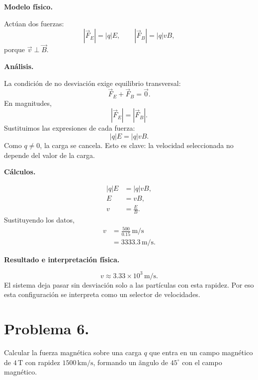 \documentclass[11pt]{article}
\begin{document}
\par\medskip\noindent\textbf{Modelo físico.}\par\smallskip
Act\'uan dos fuerzas:
\begin{equation*}
    |\vec F_E|=|q|E,
    \qquad
    |\vec F_B|=|q|vB,
\end{equation*}
porque $\vec v\perp\vec B$.

\par\medskip\noindent\textbf{Análisis.}\par\smallskip
La condici\'on de no desviaci\'on exige equilibrio transversal:
\begin{equation*}
    \vec F_E+\vec F_B=\vec0.
\end{equation*}
En magnitudes,
\begin{equation*}
    |\vec F_E|=|\vec F_B|.
\end{equation*}
Sustituimos las expresiones de cada fuerza:
\begin{equation*}
    |q|E=|q|vB.
\end{equation*}
Como $q\neq0$, la carga se cancela. Esto es clave: la velocidad seleccionada no depende del valor de la carga.

\par\medskip\noindent\textbf{Cálculos.}\par\smallskip
\begin{align*}
    |q|E&=|q|vB,\\
    E&=vB,\\
    v&=\frac{E}{B}.
\end{align*}
Sustituyendo los datos,
\begin{align*}
    v&=\frac{500}{0.15}\,\mathrm{m/s}\\
     &=3333.3\,\mathrm{m/s}.
\end{align*}

\par\medskip\noindent\textbf{Resultado e interpretación física.}\par\smallskip
\begin{equation*}
    \boxed{v\approx3.33\times10^3\,\mathrm{m/s}}.
\end{equation*}
El sistema deja pasar sin desviaci\'on solo a las part\'iculas con esta rapidez. Por eso esta configuraci\'on se interpreta como un selector de velocidades.

\newpage

\section*{Problema 6.}
Calcular la fuerza magn\'etica sobre una carga $q$ que entra en un campo magn\'etico de $4\,\mathrm T$ con rapidez $1500\,\mathrm{km/s}$, formando un \~angulo de $45^\circ$ con el campo magn\'etico.
\end{document}
